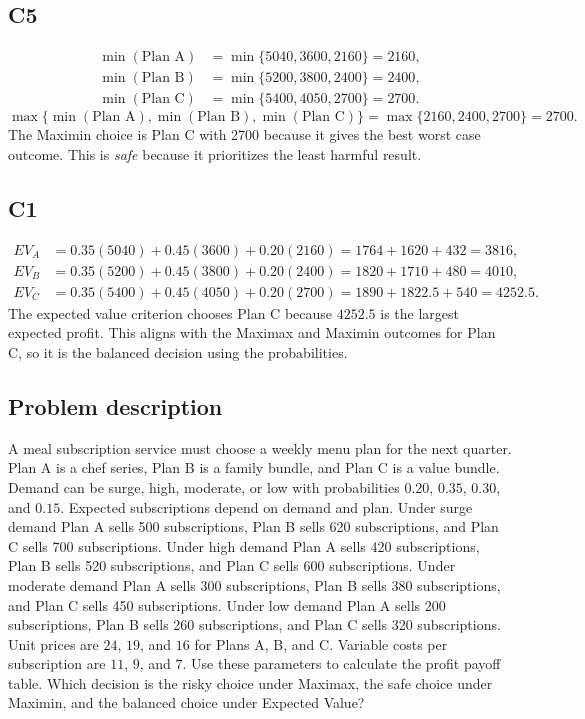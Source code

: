 \begin{ExamProblems}
		\subsection*{C5}
		\[
		\begin{aligned}
		\min(\text{Plan A}) &= \min\{5040,3600,2160\} = 2160,\\
		\min(\text{Plan B}) &= \min\{5200,3800,2400\} = 2400,\\
		\min(\text{Plan C}) &= \min\{5400,4050,2700\} = 2700.
		\end{aligned}
		\]
		\[
		\max\{\min(\text{Plan A}), \min(\text{Plan B}), \min(\text{Plan C})\}
		= \max\{2160, 2400, 2700\}
		= 2700.
		\]
		The Maximin choice is Plan C with 2700 because it gives the best worst case outcome. This is \emph{safe} because it prioritizes the least harmful result.

		\subsection*{C1}
		\[
		\begin{aligned}
		EV_A &= 0.35(5040)+0.45(3600)+0.20(2160)=1764+1620+432=3816,\\
		EV_B &= 0.35(5200)+0.45(3800)+0.20(2400)=1820+1710+480=4010,\\
		EV_C &= 0.35(5400)+0.45(4050)+0.20(2700)=1890+1822.5+540=4252.5.
		\end{aligned}
		\]
			The expected value criterion chooses Plan C because $4252.5$ is the largest expected profit. This aligns with the Maximax and Maximin outcomes for Plan C, so it is the balanced decision using the probabilities.
	
			\item
			\subsection*{Problem description}
			A meal subscription service must choose a weekly menu plan for the next quarter. Plan A is a chef series, Plan B is a family bundle, and Plan C is a value bundle. Demand can be surge, high, moderate, or low with probabilities $0.20$, $0.35$, $0.30$, and $0.15$. Expected subscriptions depend on demand and plan. Under surge demand Plan A sells 500 subscriptions, Plan B sells 620 subscriptions, and Plan C sells 700 subscriptions. Under high demand Plan A sells 420 subscriptions, Plan B sells 520 subscriptions, and Plan C sells 600 subscriptions. Under moderate demand Plan A sells 300 subscriptions, Plan B sells 380 subscriptions, and Plan C sells 450 subscriptions. Under low demand Plan A sells 200 subscriptions, Plan B sells 260 subscriptions, and Plan C sells 320 subscriptions. Unit prices are $24$, $19$, and $16$ for Plans A, B, and C. Variable costs per subscription are $11$, $9$, and $7$. Use these parameters to calculate the profit payoff table. Which decision is the risky choice under Maximax, the safe choice under Maximin, and the balanced choice under Expected Value?
	

\end{ExamProblems}

